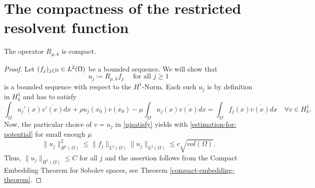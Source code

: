 \section{The compactness of the restricted resolvent function} \label{sec:4.2}

\begin{theorem} \label{3.1:thm-Rmuk.isCompact}
	The operator $R_{\mu, k}$ is compact.

	\begin{proof}
	Let $(f_{j})_{j \in \mathbb{N}} \in L^{2}(\Omega)$ be a  bounded sequence. We will show that 
		\[ u_{j} \coloneqq R_{\mu, k} f_{j} \quad \text{ for all } j \geq 1 \]
	is a bounded sequence with respect to the $H^{1}$-Norm. Each such $u_{j}$ is by definition in $H^{1}_{k}$ and has to satisfy
		\begin{equation}
			\int_{\Omega} u_{j}'(x) \overline{v'(x)} dx + \rho u_{j}(x_{0}) \overline{v(x_{0})} - \mu \int_{\Omega} u_{j}(x) \overline{v(x)} dx = \int_{\Omega} f_{j}(x) \overline{v(x)} dx \quad \forall v \in H^{1}_{k}. \label{ujsatisfy}
		\end{equation} 
	Now, the particular choice of $v = u_{j}$ in \eqref{ujsatisfy} yields with \eqref{estimation-for-potential} for small enough $\mu$
		\[  \| u_{j} \|_{H^{1}(\Omega)}^{2} \leq \| f_{j} \|_{L^{2}(\Omega)} \| u_{j} \|_{L^{2}(\Omega)} \leq c \sqrt{vol(\Omega)}. \] %
	Thus, $\| u_{j} \|_{H^{1}(\Omega)} \leq C$ for all $j$ and the assertion follows from the Compact Embedding Theorem for Sobolev spaces, see Theorem \ref{compact-embedding-theorem}.
	\end{proof}	
\end{theorem}		

